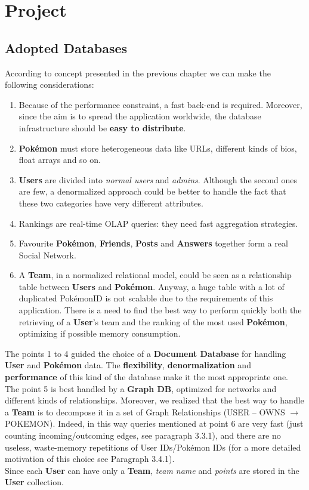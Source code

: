 \section{Project}
\subsection{Adopted Databases}
According to concept presented in the previous chapter we can make the following considerations:
\begin{enumerate}
\item Because of the performance constraint, a fast back-end is required. Moreover, since the aim is to spread the application worldwide, the database infrastructure should be \textbf{easy to distribute}.
\item \textbf{Pokémon} must store heterogeneous data like URLs, different kinds of bios, float arrays and so on.
\item \textbf{Users} are divided into \textit{normal users} and \textit{admins}. Although the second ones are few, a denormalized approach could be better to handle the fact that these two categories have very different attributes.
\item Rankings are real-time OLAP queries: they need fast aggregation strategies.
\item Favourite \textbf{Pokémon}, \textbf{Friends}, \textbf{Posts} and \textbf{Answers} together form a real Social Network.
\item A \textbf{Team}, in a normalized relational model, could be seen as a relationship table between \textbf{Users} and \textbf{Pokémon}. Anyway, a huge table with a lot of duplicated PokémonID is not scalable due to the requirements of this application. There is a need to find the best way to perform quickly both the retrieving of a \textbf{User}’s team and the ranking of the most used \textbf{Pokémon}, optimizing if possible memory consumption.
\end{enumerate}

The points 1 to 4 guided the choice of a \textbf{Document Database} for handling \textbf{User} and \textbf{Pokémon} data. The \textbf{flexibility}, \textbf{denormalization} and \textbf{performance} of this kind of the database make it the most appropriate one.\medspace \\

The point 5 is best handled by a \textbf{Graph DB}, optimized for networks and different kinds of relationships. Moreover, we realized that the best way to handle a \textbf{Team} is to decompose it in a set of Graph Relationships (USER – OWNS $\rightarrow$ POKEMON).  Indeed, in this way queries mentioned at point 6 are very fast (just counting incoming/outcoming edges, see paragraph 3.3.1), and there are no useless, waste-memory repetitions of User IDs/Pokémon IDs (for a more detailed motivation of this choice see Paragraph 3.4.1). \\
Since each \textbf{User} can have only a \textbf{Team}, \textit{team name} and \textit{points} are stored in the \textbf{User} collection.


